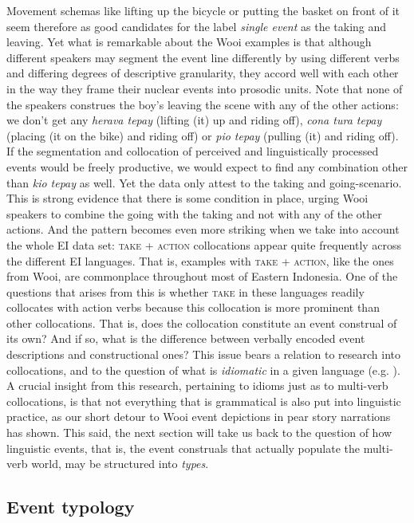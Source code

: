 Movement schemas like lifting up the bicycle or putting the basket on front of it seem therefore as good candidates for the label \textit{single event} as the taking and leaving. Yet what is remarkable about the Wooi examples is that although different speakers may segment the event line differently by using different verbs and differing degrees of descriptive granularity, they accord well with each other in the way they frame their nuclear events into prosodic units. Note that none of the speakers construes the boy's leaving the scene with any of the other actions: we don't get any \textit{herava tepay} (lifting (it) up and riding off), \textit{cona tura tepay} (placing (it on the bike) and riding off) or \textit{pio tepay} (pulling (it) and riding off). If the segmentation and collocation of perceived and linguistically processed events would be freely productive, we would expect to find any combination other than \textit{kio tepay} as well. Yet the data only attest to the taking and going-scenario. This is strong evidence that there is some condition in place, urging Wooi speakers to combine the going with the taking and not with any of the other actions. And the pattern becomes even more striking when we take into account the whole EI data set: \textsc{take} + \textsc{action} collocations appear quite frequently across the different EI languages. That is, examples with \textsc{take} + \textsc{action}, like the ones from Wooi, are commonplace throughout most of Eastern Indonesia. One of the questions that arises from this is whether \textsc{take} in these languages readily collocates with action verbs because this collocation is more prominent than other collocations. That is, does the collocation constitute an event construal of its own? And if so, what is the difference between verbally encoded event descriptions and constructional ones? This issue  bears a relation to research into collocations, and to the question of what is \emph{idiomatic} in a given language (e.g. \citealt{fillmore1988regularity, kay1999grammatical}). A crucial insight from this research, pertaining to idioms just as to multi-verb collocations, is that not everything that is grammatical is also put into linguistic practice, as our short detour to Wooi event depictions in pear story narrations has shown. This said, the next section will take us back to the question of how linguistic events, that is, the event construals that actually populate the multi-verb world, may be structured into \emph{types}.

\subsection{Event typology}\label{sec:event-typology}

